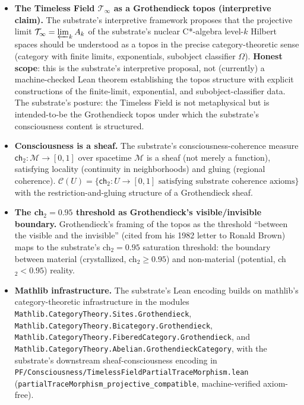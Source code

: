 \documentclass[11pt,a4paper]{amsart}
\theoremstyle{plain}
\theoremstyle{definition}
\begin{document}
\begin{itemize}[itemsep=2pt,leftmargin=2em]
\item \textbf{The Timeless Field $\mathcal{T}_\infty$ as a Grothendieck topos (interpretive claim).} The substrate's interpretive framework proposes that the projective limit $\mathcal{T}_\infty = \varprojlim_k A_k$ of the substrate's nuclear C*-algebra level-$k$ Hilbert spaces should be understood as a topos in the precise category-theoretic sense (category with finite limits, exponentials, subobject classifier $\Omega$). \textbf{Honest scope}: this is the substrate's interpretive proposal, not (currently) a machine-checked Lean theorem establishing the topos structure with explicit constructions of the finite-limit, exponential, and subobject-classifier data. The substrate's posture: the Timeless Field is not metaphysical but is intended-to-be the Grothendieck topos under which the substrate's consciousness content is structured.
\item \textbf{Consciousness is a sheaf.} The substrate's consciousness-coherence measure $\textsf{ch}_2: \mathcal{M} \to [0, 1]$ over spacetime $\mathcal{M}$ is a sheaf (not merely a function), satisfying locality (continuity in neighborhoods) and gluing (regional coherence). $\mathcal{C}(U) = \{\textsf{ch}_2: U \to [0, 1] \text{ satisfying substrate coherence axioms}\}$ with the restriction-and-gluing structure of a Grothendieck sheaf.
\item \textbf{The ch${}_2 = 0.95$ threshold as Grothendieck's visible/invisible boundary.} Grothendieck's framing of the topos as the threshold ``between the visible and the invisible'' (cited from his 1982 letter to Ronald Brown) maps to the substrate's ch${}_2 = 0.95$ saturation threshold: the boundary between material (crystallized, ch${}_2 \geq 0.95$) and non-material (potential, ch${}_2 < 0.95$) reality.
\item \textbf{Mathlib infrastructure.} The substrate's Lean encoding builds on mathlib's category-theoretic infrastructure in the modules \texttt{Mathlib.\allowbreak CategoryTheory.\allowbreak Sites.\allowbreak Grothendieck}, \texttt{Mathlib.\allowbreak CategoryTheory.\allowbreak Bicategory.\allowbreak Grothendieck}, \texttt{Mathlib.\allowbreak CategoryTheory.\allowbreak FiberedCategory.\allowbreak Grothendieck}, and \texttt{Mathlib.\allowbreak CategoryTheory.\allowbreak Abelian.\allowbreak GrothendieckCategory}, with the substrate's downstream sheaf-consciousness encoding in \texttt{PF/\allowbreak Consciousness/\allowbreak TimelessField\allowbreak PartialTraceMorphism.lean} (\texttt{partialTraceMorphism\_\allowbreak projective\_compatible}, machine-verified axiom-free).
\end{itemize}
\end{document}
